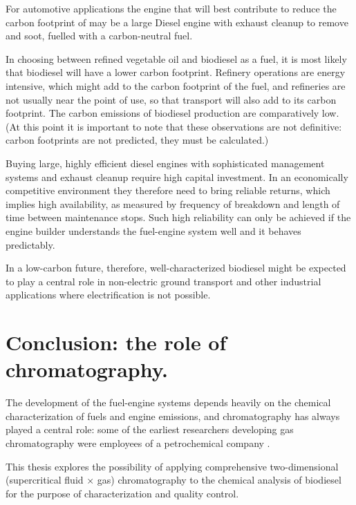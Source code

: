 For automotive applications the engine that will best contribute to reduce the
carbon footprint of may be a large Diesel engine with exhaust cleanup to remove
\nox and soot, fuelled with a carbon-neutral fuel.

In choosing between refined vegetable oil and biodiesel as a fuel, it is most
likely that biodiesel will have a lower carbon footprint. Refinery operations
are energy intensive, which might add to the carbon footprint of the fuel, and
refineries are not usually near the point of use, so that transport will also
add to its carbon footprint. The carbon emissions of biodiesel production are
comparatively low. (At this point it is important to note that these
observations are not definitive: carbon footprints are not predicted, they must
be calculated.)

Buying large, highly efficient diesel engines with sophisticated management
systems and exhaust cleanup require high capital investment. In an economically
competitive environment they therefore need to bring reliable returns, which
implies high availability, as measured by frequency of breakdown and length of
time between maintenance stops. Such high reliability can only be achieved if
the engine builder understands the fuel-engine system well and it behaves
predictably.

In a low-carbon future, therefore, well-characterized biodiesel might be
expected to play a central role in non-electric ground transport and other
industrial applications where electrification is not possible.

\section{Conclusion: the role of chromatography.}

The development of the fuel-engine systems depends heavily on the chemical
characterization of fuels and engine emissions, and chromatography has always
played a central role: some of the earliest researchers developing gas
chromatography were employees of a petrochemical company
\autocite{Keulemans1955}.

This thesis explores the possibility of applying comprehensive two-dimensional
(supercritical fluid ×  gas) chromatography to the chemical analysis of
biodiesel for the purpose of characterization and quality control.


